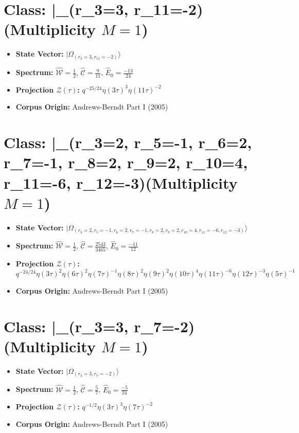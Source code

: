 \documentclass[11pt,twoside,openright]{book}
\begin{document}
\section*{Class: |\Omega_{(r_{3}=3, r_{11}=-2)}\rangle (Multiplicity $M=1$)}
\begin{itemize}
  \item \textbf{State Vector:} $|\Omega_{(r_{3}=3, r_{11}=-2)}\rangle$
  \item \textbf{Spectrum:} $\hat{\mathcal{W}} = \frac{1}{2}$, $\hat{\mathcal{C}} = \frac{9}{11}$, $\hat{E}_0 = \frac{-13}{24}$
  \item \textbf{Projection $\mathcal{Z}(\tau)$:} $q^{-25/24} \eta(3\tau)^{3} \eta(11\tau)^{-2}$
  \item \textbf{Corpus Origin:} Andrews-Berndt Part I (2005)
\end{itemize}

\section*{Class: |\Omega_{(r_{3}=2, r_{5}=-1, r_{6}=2, r_{7}=-1, r_{8}=2, r_{9}=2, r_{10}=4, r_{11}=-6, r_{12}=-3)}\rangle (Multiplicity $M=1$)}
\begin{itemize}
  \item \textbf{State Vector:} $|\Omega_{(r_{3}=2, r_{5}=-1, r_{6}=2, r_{7}=-1, r_{8}=2, r_{9}=2, r_{10}=4, r_{11}=-6, r_{12}=-3)}\rangle$
  \item \textbf{Spectrum:} $\hat{\mathcal{W}} = \frac{1}{2}$, $\hat{\mathcal{C}} = \frac{2543}{3465}$, $\hat{E}_0 = \frac{-11}{12}$
  \item \textbf{Projection $\mathcal{Z}(\tau)$:} $q^{-24/24} \eta(3\tau)^{2} \eta(6\tau)^{2} \eta(7\tau)^{-1} \eta(8\tau)^{2} \eta(9\tau)^{2} \eta(10\tau)^{4} \eta(11\tau)^{-6} \eta(12\tau)^{-3} \eta(5\tau)^{-1}$
  \item \textbf{Corpus Origin:} Andrews-Berndt Part I (2005)
\end{itemize}

\section*{Class: |\Omega_{(r_{3}=3, r_{7}=-2)}\rangle (Multiplicity $M=1$)}
\begin{itemize}
  \item \textbf{State Vector:} $|\Omega_{(r_{3}=3, r_{7}=-2)}\rangle$
  \item \textbf{Spectrum:} $\hat{\mathcal{W}} = \frac{1}{2}$, $\hat{\mathcal{C}} = \frac{5}{7}$, $\hat{E}_0 = \frac{-5}{24}$
  \item \textbf{Projection $\mathcal{Z}(\tau)$:} $q^{-1/2} \eta(3\tau)^{3} \eta(7\tau)^{-2}$
  \item \textbf{Corpus Origin:} Andrews-Berndt Part I (2005)
\end{itemize}
\end{document}
